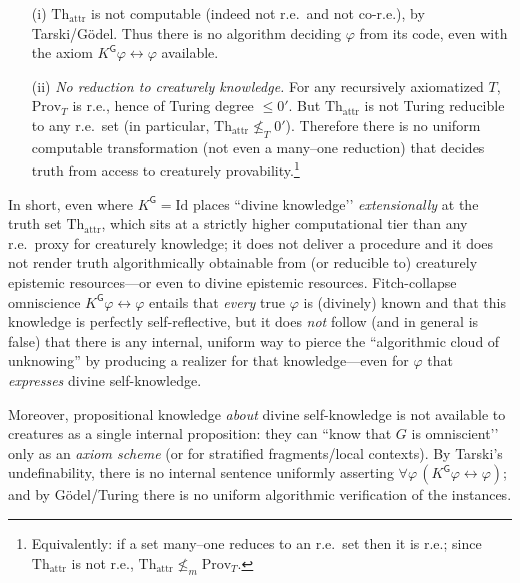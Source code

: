 \documentclass[11pt]{article}
\theoremstyle{upright}
\begin{document}
\begin{itemize}[leftmargin=2em]
\item[(i)] $\mathrm{Th}_{\mathrm{attr}}$ is not computable (indeed not r.e.\ and not co-r.e.), by Tarski/Gödel. Thus there is no algorithm deciding $\varphi$ from its code, even with the axiom $K^{\mathsf G}\varphi\leftrightarrow\varphi$ available.
\item[(ii)] \emph{No reduction to creaturely knowledge.} For any recursively axiomatized $T$, $\mathrm{Prov}_T$ is r.e., hence of Turing degree $\le 0'$. But $\mathrm{Th}_{\mathrm{attr}}$ is not Turing reducible to any r.e.\ set (in particular, $\mathrm{Th}_{\mathrm{attr}}\nleq_T 0'$). Therefore there is no uniform computable transformation (not even a many–one reduction) that decides truth from access to creaturely provability.\footnote{Equivalently: if a set many–one reduces to an r.e.\ set then it is r.e.; since $\mathrm{Th}_{\mathrm{attr}}$ is not r.e., $\mathrm{Th}_{\mathrm{attr}}\nleq_m \mathrm{Prov}_T$.}
\end{itemize}
In short, even where $K^{\mathsf G}=\mathrm{Id}$ places “divine knowledge’’ \emph{extensionally} at the truth set $\mathrm{Th}_{\mathrm{attr}}$, which sits at a strictly higher computational tier than any r.e.\ proxy for creaturely knowledge; it does not deliver a procedure and it does not render truth algorithmically obtainable from (or reducible to) creaturely epistemic resources---or even to divine epistemic resources. Fitch-collapse omniscience $K^{\mathsf G}\varphi\!\leftrightarrow\!\varphi$ entails that \emph{every} true $\varphi$ is (divinely) known and that this knowledge is perfectly self-reflective, but it does \emph{not} follow (and in general is false) that there is any internal, uniform way to pierce the ``algorithmic cloud of unknowing'' by producing a realizer for that knowledge—even for $\varphi$ that \emph{expresses} divine self-knowledge. 

Moreover, propositional knowledge \emph{about} divine self-knowledge is not available to creatures as a single internal proposition: they can “know that \(G\) is omniscient’’ only as an \emph{axiom scheme} (or for stratified fragments/local contexts). By Tarski’s undefinability, there is no internal sentence uniformly asserting \(\forall\varphi\,(K^{\mathsf G}\varphi \leftrightarrow \varphi)\); and by Gödel/Turing there is no uniform algorithmic verification of the instances.
\end{document}
